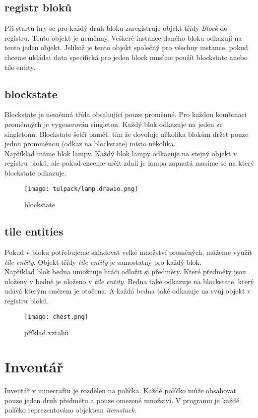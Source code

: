 \documentclass[FM,RP]{tulthesis}
\begin{document}
\subsection{registr bloků}
Při startu hry se pro každý druh bloku zaregistruje objekt třídy \textit{Block} do registru. Tento objekt je neměnný. Veškeré instance daného bloku odkazují na tento jeden objekt. Jelikož je tento objekt společný pro všechny instance, pokud chceme ukládat data
specifická pro jeden block musíme použít blockstate anebo tile entity.
\subsection{blockstate}
Blockstate je neměnná třída obsahující pouze proměnné. Pro každou kombinaci proměnných je vygenerován singleton. Každý blok odkazuje na jeden ze singletonů. Blockstate šetří pamět, tím že dovoluje několika blokům držet pouze jednu promměnou (odkaz na blockstate) místo několika. \\Například máme blok lampy. Každý blok lampy odkazuje na stejný objekt v registru bloků, ale pokud chceme určit zdali je lampa zapnutá musíme se na který blockstate odkazuje.

\begin{figure}[h]
    \centering
    \texttt{[image: tulpack/lamp.drawio.png]}
    \caption{blockstate}
    \label{fig:blockstate}
\end{figure}

\subsection{tile entities}
Pokud v bloku potřebujeme skladovat velké množství proměných, můžeme využít \textit{tile entity}. Objekt třídy \textit{tile entity} je samostatný pro každý blok.\\
Například blok bedna umožnuje hráči odložit si předměty. Které předměty jsou uloženy v bedně je uloženo v \textit{tile entity}. Bedna také odkazuje na blockstate, který udává kterým směrem je otočena. A každá bedna také odkazuje na svůj objekt v registru bloků. 
\begin{figure}[h]
    \centering
    \texttt{[image: chest.png]}
    \caption{příklad vztahů}
    \label{fig:enter-label}
\end{figure}

\section{Inventář}
Inventář v minecraftu je rozdělen na políčka. Každé políčko může obsahovat pouze jeden druh předmětu a pouze omezené množství. V programu je každé políčko reprezentováno objektem \textit{itemstack}. 
\end{document}
